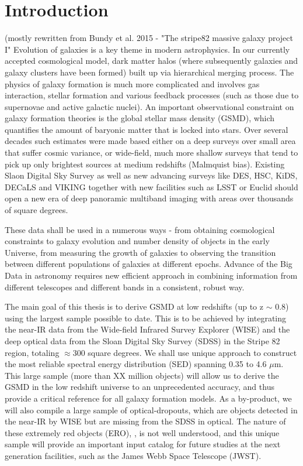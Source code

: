 \chapter{Introduction}\label{CH_01}
(mostly rewritten from Bundy et al. 2015 - "The stripe82 massive galaxy project I"
Evolution of galaxies is a key theme in modern astrophysics. In our currently accepted cosmological model, dark matter halos (where subsequently galaxies and galaxy clusters have been formed) built up via hierarchical merging process. The physics of galaxy formation is much more complicated and involves gas interaction, stellar formation and various feedback processes (such as those due to supernovae and active galactic nuclei). An important observational constraint on galaxy formation theories is the global stellar mass density (GSMD), which quantifies the amount of baryonic matter that is locked into stars. 
\vspace{5mm} %
Over several decades such estimates were made based either on a deep surveys over small area that suffer cosmic variance, or wide-field, much more shallow surveys that tend to pick up only brightest sources at medium redshifts (Malmquist bias). Existing Slaon Digital Sky Survey as well as new advancing surveys like DES, HSC, KiDS, DECaLS and VIKING together with new facilities such as LSST or Euclid should open a new era of deep panoramic multiband imaging with areas over thousands of square degrees.

These data shall be used in a numerous ways - from obtaining cosmological constraints to galaxy evolution and number density of objects in the early Universe, from measuring the growth of galaxies to observing the transition between different populations of galaxies at different epochs. Advance of the Big Data in astronomy requires new efficient  approach in combining information from different telescopes and different bands in a consistent, robust way.

The main goal of this thesis is to derive GSMD at low redshifts (up to z $\sim$ 0.8) using the largest sample possible to date. This is to be achieved by integrating the near-IR data from the Wide-field Infrared Survey Explorer (WISE) and the deep optical data from the Sloan Digital Sky Survey (SDSS) in the Stripe 82 region, totaling $\approx300 $ square degrees. We shall use unique approach to construct the most reliable spectral energy distribution (SED) spanning 0.35 to 4.6 $\mu$m. This large sample (more than XX million objects) will allow us to derive the GSMD in the low redshift universe to an unprecedented accuracy, and thus provide a critical reference for all galaxy formation models. As a by-product, we will also compile a large sample of optical-dropouts, which are objects detected in the near-IR by WISE but are missing from the SDSS in optical. The nature of these extremely red objects (ERO), \cite{Graham1996a}, \cite{Yan2004} is not well understood, and this unique sample will provide an important input catalog for future studies at the next generation facilities, such as the James Webb Space Telescope (JWST).

